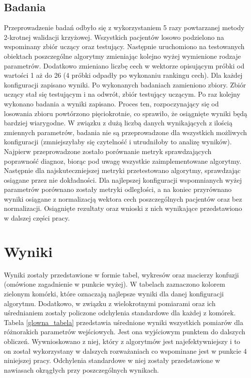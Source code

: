 \documentclass[12pt]{article}
\begin{document}
\subsection{Badania}
\indent  Przeprowadzenie badań odbyło się z wykorzystaniem 5 razy powtarzanej metody 2-krotnej walidacji krzyżowej. Wszystkich pacjentów losowo podzielono na wspominany zbiór uczący oraz testujący. Następnie uruchomiono na testowanych obiektach poszczególne algorytmy zmieniając kolejno wyżej wymienione rodzaje parametrów. Dodatkowo zmieniano liczbę cech w wektorze opisującym próbki od wartości 1 aż do 26 (4 próbki odpadły po wykonaniu rankingu cech). Dla każdej konfiguracji zapisano wyniki. Po wykonanych badaniach zamieniono zbiory. Zbiór uczący stał się testującym i na odwrót, zbiór testujący uczącym. Po raz kolejny wykonano badania a wyniki zapisano. Proces ten, rozpoczynający się od losowania zbioru powtórzono pięciokrotnie, co sprawiło, że osiągnięte wyniki będą bardziej wiarygodne.
\newline
\indent W związku z dużą liczbą danych wynikających z ilością zmiennych parametrów, badania nie są przeprowadzone dla wszystkich możliwych konfiguracji (zmniejszyłaby się czytelność i utrudniłoby to analizę wyników). Najpierw przeprowadzone zostało porównanie metryk sprawdzających poprawność diagnoz, biorąc pod uwagę wszystkie zaimplementowane algorytmy. Następnie dla najskuteczniejszej metryki przetestowano algorytmy, sprawdzając osiągane przez nie dokładności. Dla najlepszej konfiguracji wspomnianych wyżej parametrów porównano zostały metryki odległości, a na koniec przyrównano wyniki osiągane z normalizacją wektora cech poszczególnych pacjentów oraz bez normalizacji. Osiągnięte rezultaty oraz wnioski z nich wynikające przedstawiono w dalszej części pracy.
\newpage

\section{Wyniki}
Wyniki zostały przedstawione w formie tabel, wykresów oraz macierzy konfuzji (omówione zagadnienie w punkcie wyżej). W tabelach zaznaczono kolorem zielonym komórki, które oznaczają najlepsze wyniki dla danej konfiguracji algorytmu. Dodatkowo, w związku z wielokrotnymi pomiarami oraz ich uśrednianiem zostały policzone odchylenia standardowe dla każdej z komórek. Tabela  \ref{glowna_tabela} przedstawia uśrednione wyniki wszystkich pomiarów dla różnorakich parametrów wejściowych. Jest ona wyjściowym punktem do dalszych obliczeń. Wywnioskowano z niej, który z algorytmów jest najefektywniejszy i to on został wykorzystany w dalszych rozważaniach co wspominane jest w punkcie 4 niniejszej pracy.  Odchylenia standardowe w niej zostały przedstawione w nawiasach okrągłych przy poszczególnych wynikach. \\
\end{document}
